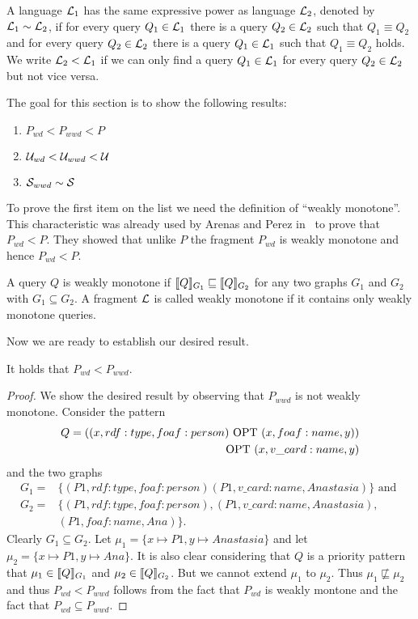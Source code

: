 \begin{definition}
	A language $\mathcal{L}_1$ has the same expressive power as language $\mathcal{L}_2$, denoted by
	$\mathcal{L}_1 \sim \mathcal{L}_2$, if for every query $Q_1 \in \mathcal{L}_1$ there is a query $Q_2 \in
	\mathcal{L}_2$ such that $Q_1 \equiv Q_2$ and for every query $Q_2 \in \mathcal{L}_2$ there is a
	query $Q_1 \in \mathcal{L}_1$ such that $Q_1 \equiv Q_2$ holds. 
	We write $\mathcal{L}_2 < \mathcal{L}_1$ if we can only find a query $Q_1 \in \mathcal{L}_1$ for every
	query $Q_2 \in \mathcal{L}_2$ but not vice versa.
\end{definition}
The goal for this section is to show the following results: 
\begin{enumerate}
	\item $P_{wd} < P_{wwd} <P$
	\item $\mathcal{U}_{wd} < \mathcal{U}_{wwd} < \mathcal{U}$
	\item $\mathcal{S}_{wwd} \sim \mathcal{S}$
\end{enumerate}
To prove the first item on the list we need the definition of ``weakly
monotone''. This characteristic was already used by Arenas and Perez in~\cite{arenas2011querying}
to prove that $P_{wd} < P$. They showed that unlike $P$ the fragment $P_{wd}$ is
weakly monotone and hence $P_{wd} < P$.
\begin{definition}
	A query $Q$ is weakly monotone if $\llbracket Q \rrbracket_{G_1} \sqsubseteq \llbracket Q
	\rrbracket_{G_2}$ for any two graphs $G_1$ and $G_2$ with $G_1 \subseteq G_2$.
	A fragment $\mathcal{L}$ is called weakly monotone if it contains only weakly
	monotone queries.
\end{definition}

Now we are ready to establish our desired result.

\begin{theorem}
	It holds that $P_{wd} < P_{wwd}$.
\end{theorem}
\begin{proof}
	We show the desired result by observing that $P_{wwd}$ is not weakly
	monotone.
	Consider the pattern
	\begin{align*}
		Q=((x,rdf:type,foaf:person) \mbox{ OPT } (x,foaf:name,y))\\
		\mbox{ OPT } (x,v\_card:name,y)
	\end{align*}
	and the two graphs
	\begin{align*}
		G_1 =& \{(P1,rdf:type,foaf:person) (P1, v\_card:name,Anastasia) \}
		\mbox{ and } \\
		G_2=& \{(P1,rdf:type,foaf:person), (P1, v\_card:name,Anastasia),\\
			&(P1, foaf:name, Ana) \}.
	\end{align*}
	Clearly $G_1 \subseteq G_2$. Let $\mu_1 = \{x \mapsto
	P1, y \mapsto Anastasia\}$ and let $\mu_2 = \{x \mapsto
	P1, y \mapsto Ana\}$. It is also clear considering that $Q$ is a priority
	pattern that $\mu_1 \in \llbracket Q \rrbracket_{G_1}$ and  $\mu_2 \in \llbracket Q \rrbracket_{G_2}$. But
	we cannot extend $\mu_1$ to $\mu_2$. Thus $\mu_1 \not\sqsubseteq \mu_2$ and
	thus $P_{wd} < P_{wwd}$ follows from the fact that $P_{wd}$ is weakly
	montone and the fact that $P_{wd} \subseteq P_{wwd}$.
\end{proof}

